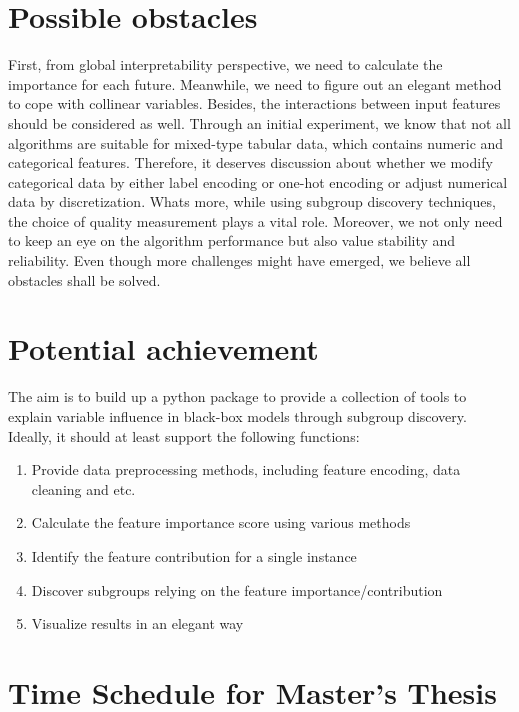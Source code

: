 \documentclass[runningheads]{llncs}
\begin{document}
	\section{Possible obstacles}
	
    First, from global interpretability perspective, we need to calculate the importance for each future. Meanwhile, we need to figure out an elegant method to cope with collinear variables. Besides, the interactions between input features should be considered as well. Through an initial experiment, we know that not all algorithms are suitable for mixed-type tabular data, which contains numeric and categorical features. Therefore, it deserves discussion about whether we modify categorical data by either label encoding or one-hot encoding or adjust numerical data by discretization. What\textquotesingle s more, while using subgroup discovery techniques, the choice of quality measurement plays a vital role. Moreover, we not only need to keep an eye on the algorithm performance but also value stability and reliability. Even though more challenges might have emerged, we believe all obstacles shall be solved. 

	\section{Potential achievement}
	
	The aim is to build up a python package to provide a collection of tools to explain variable influence in black-box models through subgroup discovery. Ideally, it should at least support the following functions:
	
	\begin{enumerate}
		\item Provide data preprocessing methods, including feature encoding, data cleaning and etc.
		\item Calculate the feature importance score using various methods
		\item Identify the feature contribution for a single instance
		\item Discover subgroups relying on the feature importance/contribution
		\item Visualize results in an elegant way
	\end{enumerate}
	
	\section{Time Schedule for Master’s Thesis }
	
\end{document}
